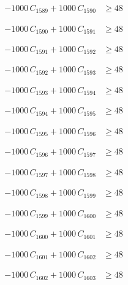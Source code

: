 \documentclass[a4paper,11pt]{article}
\begin{document}
\begin{align}
-1000\,C_{1589} + 1000\,C_{1590} &\geq 48 \nonumber
\end{align}

\begin{align}
-1000\,C_{1590} + 1000\,C_{1591} &\geq 48 \nonumber
\end{align}

\begin{align}
-1000\,C_{1591} + 1000\,C_{1592} &\geq 48 \nonumber
\end{align}

\begin{align}
-1000\,C_{1592} + 1000\,C_{1593} &\geq 48 \nonumber
\end{align}

\begin{align}
-1000\,C_{1593} + 1000\,C_{1594} &\geq 48 \nonumber
\end{align}

\begin{align}
-1000\,C_{1594} + 1000\,C_{1595} &\geq 48 \nonumber
\end{align}

\begin{align}
-1000\,C_{1595} + 1000\,C_{1596} &\geq 48 \nonumber
\end{align}

\begin{align}
-1000\,C_{1596} + 1000\,C_{1597} &\geq 48 \nonumber
\end{align}

\begin{align}
-1000\,C_{1597} + 1000\,C_{1598} &\geq 48 \nonumber
\end{align}

\begin{align}
-1000\,C_{1598} + 1000\,C_{1599} &\geq 48 \nonumber
\end{align}

\begin{align}
-1000\,C_{1599} + 1000\,C_{1600} &\geq 48 \nonumber
\end{align}

\begin{align}
-1000\,C_{1600} + 1000\,C_{1601} &\geq 48 \nonumber
\end{align}

\begin{align}
-1000\,C_{1601} + 1000\,C_{1602} &\geq 48 \nonumber
\end{align}

\begin{align}
-1000\,C_{1602} + 1000\,C_{1603} &\geq 48 \nonumber
\end{align}
\end{document}
